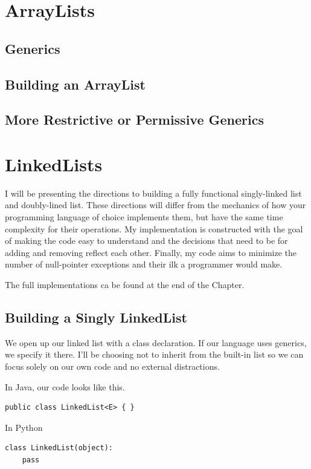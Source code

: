 \documentclass[10pt,a4paper]{book}
\begin{document}
\section{ArrayLists}

\subsection{Generics}
\subsection{Building an ArrayList}

\subsection{More Restrictive or Permissive Generics}


\section{LinkedLists}


I will be presenting the directions to building a fully functional  singly-linked list and doubly-lined list.  
These directions will differ from the mechanics of how your programming language of choice implements them, but have the same time complexity for their operations.
My implementation is constructed with the goal of making the code easy to understand and the decisions that need to be for adding and removing reflect each other.
Finally, my code aims to minimize the number of null-pointer exceptions and their ilk a programmer would make.

The full implementations ca be found at the end of the Chapter.

\subsection{Building a Singly LinkedList}
We open up our linked list with a class declaration. 
If our language uses generics, we specify it there.
I'll be choosing not to inherit from the built-in list so we can focus solely on our own code and no external distractions.


In Java, our code looks like this.
\begin{verbatim}
public class LinkedList<E> { }
\end{verbatim}


In Python
\begin{verbatim}
class LinkedList(object):
	pass
\end{verbatim}
\end{document}
